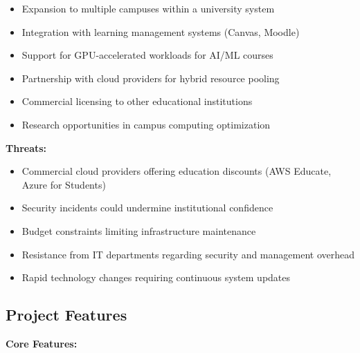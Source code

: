 \documentclass[12pt,a4paper]{article}
\begin{document}
\begin{itemize}
    \item Expansion to multiple campuses within a university system
    \item Integration with learning management systems (Canvas, Moodle)
    \item Support for GPU-accelerated workloads for AI/ML courses
    \item Partnership with cloud providers for hybrid resource pooling
    \item Commercial licensing to other educational institutions
    \item Research opportunities in campus computing optimization
\end{itemize}

\textbf{Threats:}

\begin{itemize}
    \item Commercial cloud providers offering education discounts (AWS Educate, Azure for Students)
    \item Security incidents could undermine institutional confidence
    \item Budget constraints limiting infrastructure maintenance
    \item Resistance from IT departments regarding security and management overhead
    \item Rapid technology changes requiring continuous system updates
\end{itemize}

\subsection{Project Features}
\label{sec:features}

\textbf{Core Features:}
\end{document}

